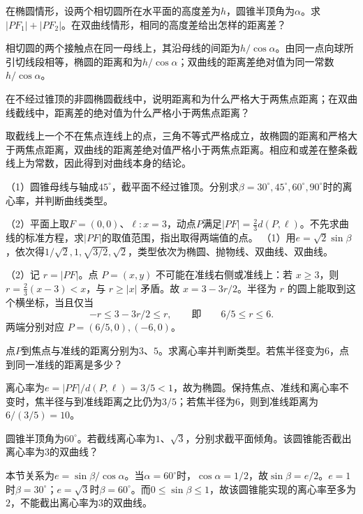 在椭圆情形，设两个相切圆所在水平面的高度差为\(h\)，圆锥半顶角为\(\alpha\)。求\(|PF_1|+|PF_2|\)。在双曲线情形，相同的高度差给出怎样的距离差？
\par
\solutionanswer
相切圆的两个接触点在同一母线上，其沿母线的间距为\(h/\cos\alpha\)。由同一点向球所引切线段相等，椭圆的距离和为\(h/\cos\alpha\)；双曲线的距离差绝对值为同一常数\(h/\cos\alpha\)。


在不经过锥顶的非圆椭圆截线中，说明距离和为什么严格大于两焦点距离；在双曲线截线中，距离差的绝对值为什么严格小于两焦点距离？
\par
\solutionanswer
取截线上一个不在焦点连线上的点，三角不等式严格成立，故椭圆的距离和严格大于两焦点距离，双曲线的距离差绝对值严格小于两焦点距离。相应和或差在整条截线上为常数，因此得到对曲线本身的结论。


（1）圆锥母线与轴成\(45^\circ\)，截平面不经过锥顶。分别求\(\beta=30^\circ,45^\circ,60^\circ,90^\circ\)时的离心率，并判断曲线类型。

（2）平面上取\(F=(0,0)\)、\(\ell:x=3\)，动点\(P\)满足\(|PF|=\frac23d(P,\ell)\)。不先求曲线的标准方程，求\(|PF|\)的取值范围，指出取得两端值的点。
\solutionanswer
（1）用\(e=\sqrt2\sin\beta\)，依次得\(1/\sqrt2,1,\sqrt{3/2},\sqrt2\)，类型依次为椭圆、抛物线、双曲线、双曲线。

（2）记 \(r=|PF|\)。点 \(P=(x,y)\) 不可能在准线右侧或准线上：若 \(x\ge3\)，则 \(r=\tfrac23(x-3)<x\)，与 \(r\ge|x|\) 矛盾。故 \(x=3-3r/2\)。半径为 \(r\) 的圆上能取到这个横坐标，当且仅当
\[
   -r\le 3-3r/2\le r,\qquad\text{即}\qquad 6/5\le r\le6 .
\]
两端分别对应 \(P=(6/5,0),(-6,0)\)。


点\(P\)到焦点与准线的距离分别为\(3\)、\(5\)。求离心率并判断类型。若焦半径变为\(6\)，点到同一准线的距离是多少？
\par
\solutionanswer
离心率为\(e=|PF|/d(P,\ell)=3/5<1\)，故为椭圆。保持焦点、准线和离心率不变时，焦半径与到准线距离之比仍为\(3/5\)；若焦半径为\(6\)，则到准线距离为\(6/(3/5)=10\)。


圆锥半顶角为\(60^\circ\)。若截线离心率为\(1\)、\(\sqrt3\)，分别求截平面倾角。该圆锥能否截出离心率为\(3\)的双曲线？
\par
\solutionanswer
本节关系为\(e=\sin\beta/\cos\alpha\)。当\(\alpha=60^\circ\)时，\(\cos\alpha=1/2\)，故\(\sin\beta=e/2\)。\(e=1\)时\(\beta=30^\circ\)；\(e=\sqrt3\)时\(\beta=60^\circ\)。而\(0\le\sin\beta\le1\)，故该圆锥能实现的离心率至多为\(2\)，不能截出离心率为\(3\)的双曲线。


